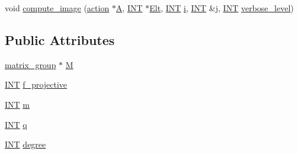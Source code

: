 \begin{DoxyCompactItemize}
\item 
void \mbox{\hyperlink{classaction__on__determinant_afc50562cf0aa95e81eb0062749dc3940}{compute\+\_\+image}} (\mbox{\hyperlink{classaction}{action}} $\ast$\mbox{\hyperlink{simeon_8_c_a97833f04c3a9c008df5521a2fc291bb4}{A}}, \mbox{\hyperlink{galois_8h_a09fddde158a3a20bd2dcadb609de11dc}{I\+NT}} $\ast$\mbox{\hyperlink{simeon_8_c_aec1406935bdb1fee3561fcb840964100}{Elt}}, \mbox{\hyperlink{galois_8h_a09fddde158a3a20bd2dcadb609de11dc}{I\+NT}} \mbox{\hyperlink{alphabet2_8_c_acb559820d9ca11295b4500f179ef6392}{i}}, \mbox{\hyperlink{galois_8h_a09fddde158a3a20bd2dcadb609de11dc}{I\+NT}} \&\mbox{\hyperlink{alphabet2_8_c_a37d972ae0b47b9099e30983131d31916}{j}}, \mbox{\hyperlink{galois_8h_a09fddde158a3a20bd2dcadb609de11dc}{I\+NT}} \mbox{\hyperlink{simeon_8_c_a818073fbcc2f439e7c56952f67386122}{verbose\+\_\+level}})
\end{DoxyCompactItemize}
\subsection*{Public Attributes}
\begin{DoxyCompactItemize}
\item 
\mbox{\hyperlink{classmatrix__group}{matrix\+\_\+group}} $\ast$ \mbox{\hyperlink{classaction__on__determinant_a05aa4e945357a792f6ac004bc9cca5a1}{M}}
\item 
\mbox{\hyperlink{galois_8h_a09fddde158a3a20bd2dcadb609de11dc}{I\+NT}} \mbox{\hyperlink{classaction__on__determinant_a38c6c5a89bb4136a51b0d9eefe53a3b4}{f\+\_\+projective}}
\item 
\mbox{\hyperlink{galois_8h_a09fddde158a3a20bd2dcadb609de11dc}{I\+NT}} \mbox{\hyperlink{classaction__on__determinant_abbe59a289ccf21444b90616a98f3aff2}{m}}
\item 
\mbox{\hyperlink{galois_8h_a09fddde158a3a20bd2dcadb609de11dc}{I\+NT}} \mbox{\hyperlink{classaction__on__determinant_a9ba25085a9461e3173aeac46e50a6f76}{q}}
\item 
\mbox{\hyperlink{galois_8h_a09fddde158a3a20bd2dcadb609de11dc}{I\+NT}} \mbox{\hyperlink{classaction__on__determinant_a06c0a34867254315ef20112ec22d96ec}{degree}}
\end{DoxyCompactItemize}
